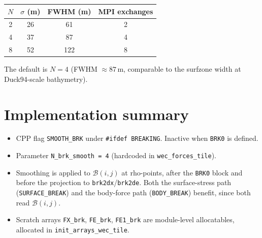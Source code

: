\documentclass[11pt]{article}
\begin{document}
\medskip
\begin{center}
\begin{tabular}{@{}cccc@{}}
\toprule
$N$ & $\sigma$ (m) & FWHM (m) & MPI exchanges \\
\midrule
2  & 26 &  61 & 2 \\
4  & 37 &  87 & 4 \\
8  & 52 & 122 & 8 \\
\bottomrule
\end{tabular}
\end{center}

\medskip\noindent
The default is $N=4$ (FWHM $\approx 87$\,m, comparable to the surfzone width
at Duck94-scale bathymetry).

\section{Implementation summary}

\begin{itemize}
\item CPP flag \texttt{SMOOTH\_BRK} under \texttt{\#ifdef BREAKING}.
  Inactive when \texttt{BRK0} is defined.
\item Parameter \texttt{N\_brk\_smooth\,=\,4} (hardcoded in
  \texttt{wec\_forces\_tile}).
\item Smoothing is applied to $\mathcal{B}(i,j)$ at rho-points, after the
  \texttt{BRK0} block and before the projection to
  \texttt{brk2dx}/\texttt{brk2de}. Both the surface-stress path
  (\texttt{SURFACE\_BREAK}) and the body-force path (\texttt{BODY\_BREAK})
  benefit, since both read $\mathcal{B}(i,j)$.
\item Scratch arrays \texttt{FX\_brk}, \texttt{FE\_brk}, \texttt{FE1\_brk}
  are module-level allocatables, allocated in \texttt{init\_arrays\_wec\_tile}.
\end{itemize}
\end{document}
